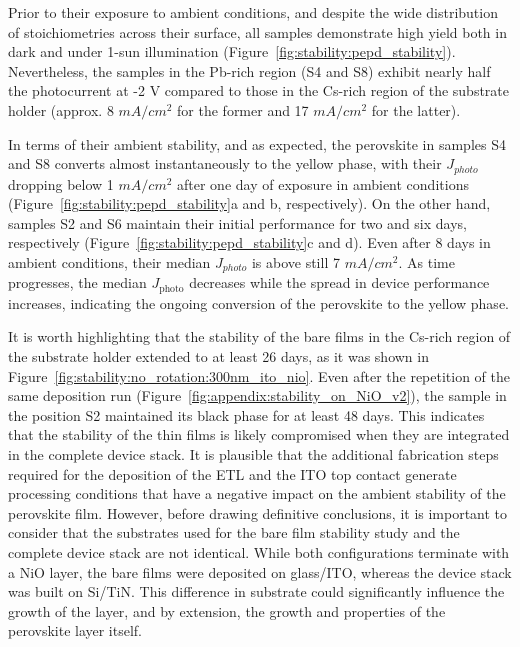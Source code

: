 Prior to their exposure to ambient conditions, and despite the wide distribution of stoichiometries across their surface, all samples demonstrate high yield both in dark and under 1-sun illumination (Figure~\ref{fig:stability:pepd_stability}). Nevertheless, the samples in the Pb-rich region (S4 and S8) exhibit nearly half the photocurrent at -2 V compared to those in the Cs-rich region of the substrate holder (approx. 8 $mA/cm^2$ for the former and 17 $m A/cm^2$ for the latter). 

In terms of their ambient stability, and as expected, the perovskite in samples S4 and S8 converts almost instantaneously to the yellow phase, with their $J_{photo}$ dropping below 1 $mA/cm^2$ after one day of exposure in ambient conditions (Figure~\ref{fig:stability:pepd_stability}a and b, respectively). On the other hand, samples S2 and S6 maintain their initial performance for two and six days, respectively (Figure~\ref{fig:stability:pepd_stability}c and d). Even after 8 days in ambient conditions, their median $J_{photo}$ is above still 7 $mA/cm^2$. As time progresses, the median $J_{\text{photo}}$ decreases while the spread in device performance increases, indicating the ongoing conversion of the perovskite to the yellow phase. 

It is worth  highlighting that the stability of the bare films in the Cs-rich region of the substrate holder extended to at least 26 days, as it was shown in Figure~\ref{fig:stability:no_rotation:300nm_ito_nio}. Even after the repetition of the same deposition run (Figure~\ref{fig:appendix:stability_on_NiO_v2}), the sample in the position S2 maintained its black phase for at least 48 days. This indicates that the stability of the  thin films is likely compromised when they are integrated in the complete device stack. It is plausible that the additional fabrication steps required for the deposition of the ETL and the ITO top contact generate processing conditions that have a negative impact on the ambient stability of the perovskite film. However, before drawing definitive conclusions, it is important to consider that the substrates used for the bare film stability study and the complete device stack are not identical. While both configurations terminate with a NiO layer, the bare films were deposited on glass/ITO, whereas the device stack was built on Si/TiN. This difference in substrate could significantly influence the growth of the  layer, and by extension, the growth and properties of the perovskite layer itself.

